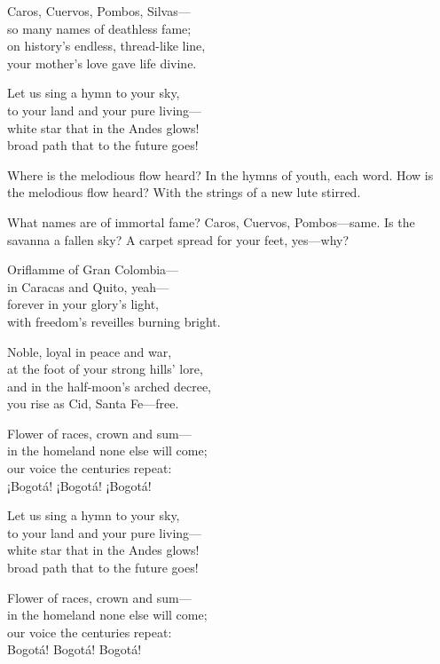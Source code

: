 \begin{lyrics}
Caros, Cuervos, Pombos, Silvas—\\
so many names of deathless fame;\\
on history’s endless, thread-like line,\\
your mother’s love gave life divine.

Let us sing a hymn to your sky,\\
to your land and your pure living—\\
white star that in the Andes glows!\\
broad path that to the future goes!

 Where is the melodious flow heard?
 In the hymns of youth, each word.
 How is the melodious flow heard?
 With the strings of a new lute stirred.

 What names are of immortal fame?
 Caros, Cuervos, Pombos—same.
 Is the savanna a fallen sky?
 A carpet spread for your feet, yes—why?

Oriflamme of Gran Colombia—\\
in Caracas and Quito, yeah—\\
forever in your glory’s light,\\
with freedom’s reveilles burning bright.

Noble, loyal in peace and war,\\
at the foot of your strong hills’ lore,\\
and in the half-moon’s arched decree,\\
you rise as Cid, Santa Fe—free.

Flower of races, crown and sum—\\
in the homeland none else will come;\\
our voice the centuries repeat:\\
¡Bogotá! ¡Bogotá! ¡Bogotá!

Let us sing a hymn to your sky,\\
to your land and your pure living—\\
white star that in the Andes glows!\\
broad path that to the future goes!

Flower of races, crown and sum—\\
in the homeland none else will come;\\
our voice the centuries repeat:\\
Bogotá! Bogotá! Bogotá!
\end{lyrics}

